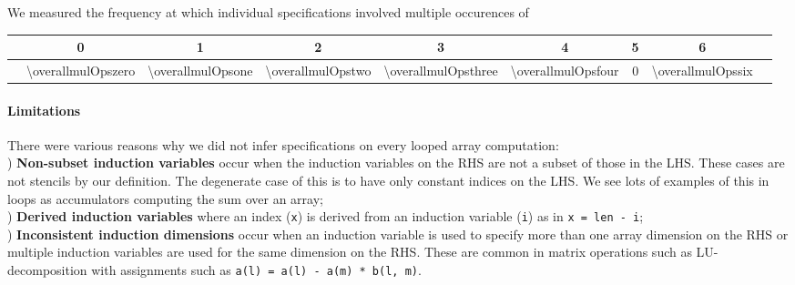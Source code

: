 We measured the frequency at which individual specifications involved
multiple occurences of \term{*}
\begin{center}
\vspace{0.25em}
\setlength{\tabcolsep}{0.57em}
{\small{
\hspace{-1em}\begin{tabular}{c|cccccccc}
& 0 & 1 & 2 & 3 & 4 & 5 & 6  \\ \hline
\term{*} & \num{\overallmulOpszero} & \num{\overallmulOpsone} & \num{\overallmulOpstwo} & \num{\overallmulOpsthree} & \num{\overallmulOpsfour} & \num{0} & \num{\overallmulOpssix}
\end{tabular}}}
\vspace{0.2em}
\end{center}
\noindent

\paragraph{Limitations}

There were various reasons why we did not infer
specifications on every looped array computation: \\
) \textbf{Non-subset induction variables} occur when the
induction variables on the RHS are not a subset of those in the LHS. These
cases are not stencils by our definition. The degenerate case of this
is to have only constant indices on the LHS. We see lots of examples
of this in loops as accumulators \eg{} computing the sum over an array; \\
) \textbf{Derived induction variables} where an
index (\texttt{x}) is derived from an
induction variable (\texttt{i}) as in
\texttt{x = len - i};  \\
) \textbf{Inconsistent induction dimensions} occur when
an induction variable is used to specify more than one array dimension
on the RHS or multiple induction variables are used for the same
dimension on the RHS. These are common in matrix operations such as
LU-decomposition with assignments such as
\texttt{a(l) = a(l) - a(m) * b(l, m)}.



